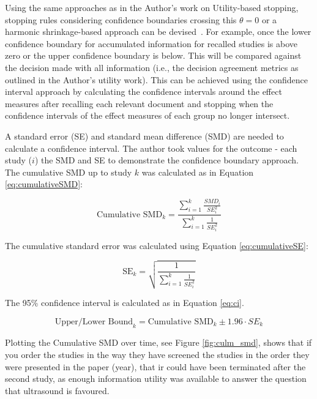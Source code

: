 \documentclass[10pt,oneside]{book}
\begin{document}
Using the same approaches as in the Author's work on Utility-based stopping, stopping rules considering confidence boundaries crossing this $\theta = 0$ or a harmonic shrinkage-based approach can be devised~\cite{lau_cumulative_1992}. For example, once the lower confidence boundary for accumulated information for recalled studies is above zero or the upper confidence boundary is below. This will be compared against the decision made with all information (i.e., the decision agreement metrics as outlined in the Author's utility work). This can be achieved using the confidence interval approach by calculating the confidence intervals around the effect measures after recalling each relevant document and stopping when the confidence intervals of the effect measures of each group no longer intersect.

A standard error (SE) and standard mean difference (SMD) are needed to calculate a confidence interval. The author took values for the outcome - each study ($i$) the SMD and SE to demonstrate the confidence boundary approach. The cumulative SMD up to study $k$ was calculated as in Equation \ref{eq:cumulativeSMD}:

\begin{equation}
    \text{Cumulative SMD}_k = \frac{\sum^k_{i=1} \frac{SMD_i}{SE^2_i}}{\sum^k_{i=1} \frac{1}{SE^2_i}}
    \label{eq:cumulativeSMD}
\end{equation}

The cumulative standard error was calculated using Equation \ref{eq:cumulativeSE}:

\begin{equation}
    \text{SE}_k = \sqrt{\frac{1}{\sum^k_{i=1} \frac{1}{SE^2_i}}}
    \label{eq:cumulativeSE}
\end{equation}


The 95\% confidence interval is calculated as in Equation \ref{eq:ci}.

\begin{equation}
    \text{Upper/Lower Bound}_k = \text{Cumulative SMD}_k \pm 1.96 \cdot SE_k
    \label{eq:ci}
\end{equation}

Plotting the Cumulative SMD over time, see Figure \ref{fig:culm_smd}, shows that if you order the studies in the way they have screened the studies in the order they were presented in the paper (year), that \gls*{ir} could have been terminated after the second study, as enough information utility was available to answer the question that ultrasound is favoured. 
\end{document}
